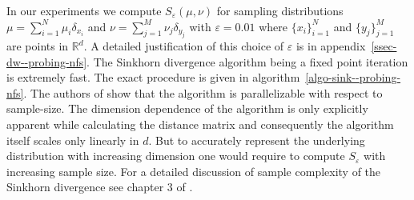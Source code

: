 In our experiments we compute $S_\varepsilon(\mu, \nu)$ for sampling distributions $\mu=\sum_{i=1}^N\mu_i\delta_{x_i}$ and $\nu=\sum_{j=1}^M\nu_j\delta_{y_j}$ with $\varepsilon=0.01$ where $\{x_i\}_{i=1}^N$ and $\{y_j\}_{j=1}^M$ are points in $\mathbb R^d$. {\color{mypink} A detailed justification of this choice of $\varepsilon$ is in appendix~\ref{ssec-dw--probing-nfs}.} The Sinkhorn divergence algorithm being a fixed point iteration is extremely fast. The exact procedure is given in algorithm~\ref{algo-sink--probing-nfs}. The authors of \cite{feydy2019interpolating} show that the algorithm is parallelizable with respect to sample-size. The dimension dependence of the algorithm is only explicitly apparent while calculating the distance matrix and consequently the algorithm itself scales only linearly in $d$. But to accurately represent the underlying distribution with increasing dimension one would require to compute $S_\varepsilon$ with increasing sample size. For a detailed discussion of sample complexity of the Sinkhorn divergence see chapter 3 of \cite{genevay2019entropy}.
